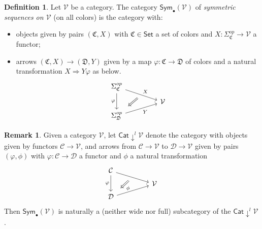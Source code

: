 \documentclass[a4paper,10pt
,draft
]{article}%
\numberwithin{equation}{section}
\numberwithin{figure}{section}
\theoremstyle{definition} %
\newtheorem{definition}[equation]{Definition}%
\newtheorem{remark}[equation]{Remark}%
\newcommand{\Cat}{\mathsf{Cat}}
\newcommand{\V}{\ensuremath{\mathcal V}}
\newcommand{\1}{\ensuremath{\mathbbm 1}}%
\begin{document}
\begin{definition}
Let $\mathcal{V}$ be a category.
The category $\mathsf{Sym}_\bullet(\mathcal{V})$ of
\textit{symmetric sequences on $\mathcal{V}$} 
(on all colors) is the category with:
\begin{itemize}
\item objects given by pairs $(\mathfrak C, X)$ with
      $\mathfrak{C} \in \mathsf{Set}$ a set of colors and
      $X \colon \Sigma_{\mathfrak{C}}^{op} \to \mathcal{V}$ a functor;
\item arrows $(\mathfrak C, X) \to (\mathfrak D, Y)$ given by a map 
      $\varphi \colon \mathfrak{C} \to \mathfrak{D}$ of colors and a natural transformation $X \Rightarrow Y \varphi$ as below.
\begin{equation}
\begin{tikzcd}[row sep = tiny, column sep = 45pt]
                  \Sigma_{\mathfrak{C}}^{op} \arrow[dr, "X"{name=U}] 
                  \arrow{dd}[swap]{\varphi}
\\
	& \mathcal{V}
\\
                  |[alias=V]| \Sigma_{\mathfrak{D}}^{op} \arrow[ur, "Y"']
                  \arrow[Leftarrow, from=V, to=U,shorten >=0.25cm,shorten <=0.25cm]
\end{tikzcd}
\end{equation}
\end{itemize}
\end{definition}


\begin{remark}\label{SUBCATDOWNL REM}
Given a category $\V$, let $\Cat \downarrow^l \V$ denote the category with
objects given by functors $\mathcal{C} \to \V$,
and arrows from $\mathcal{C} \to \V$ to $\mathcal{D} \to \V$
given by pairs 
$(\varphi,\phi)$ with 
$\varphi \colon \mathcal{C} \to \mathcal{D}$ a functor and
$\phi$ a natural transformation
\begin{equation}
\begin{tikzcd}[row sep = tiny, column sep = 45pt]
	\mathcal C \arrow{dr}[name=U]{} \arrow{dd}[swap]{\varphi}
\\
	& \mathcal{V}
\\
	|[alias=V]| \mathcal D \arrow{ur}[swap]{}
	\arrow[Leftarrow, from=V, to=U,shorten >=0.25cm,shorten <=0.25cm
    ,swap,"\phi"]
\end{tikzcd}
\end{equation}
Then $\mathsf{Sym}_{\bullet}(\mathcal{V})$ is naturally a (neither wide nor full) subcategory of the $\mathsf{Cat}\downarrow^l \mathcal{V}$.
\end{remark}
\end{document}
